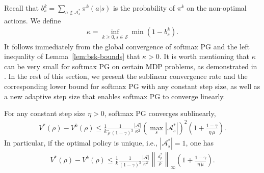 Recall that $b_s^k=\sum_{a\not\in\mathcal{A}_s^*}\pi^k(a|s)$ is the probability of $\pi^k$ on the non-optimal actions. We define 
\begin{align}
\kappa =\mathop {\mathrm{inf}} \limits_{k\ge 0,s\in \mathcal{S}}\min \left( 1-b_{s}^{k} \right) .
\label{def:kappa}
\end{align}
It follows immediately from the global convergence of softmax PG and the left inequality of Lemma~\ref{lem:bsk-bounds}
that $\kappa>0$. It is worth mentioning that $\kappa$  can be very small for softmax PG on certain MDP problems, as demonstrated in \cite{li2023exponential}.
 In the rest of this section, we present the sublinear convergence rate and the corresponding lower bound for softmax PG with any constant step size, as well as a new adaptive step size that enables softmax PG to converge linearly.  
\begin{theorem}\label{thm:softmaxPG-sublinear}
    For any  constant step size $\eta>0$, softmax PG converges sublinearly, 
    \begin{align*}
V^*(\rho)-V^k(\rho)\leq \frac{1}{k}\frac{1}{\tilde{\rho}\,(1-\gamma)^3}\frac{|\mathcal{A}|}{\kappa^2}\left(\max_s|\mathcal{A}_s^*|\right)^2\left(1+\frac{1-\gamma}{\eta\,\tilde{\mu}}\right).
\end{align*}
 In particular, if the optimal policy is unique, i.e., $|\mathcal{A}_s^*|=1$,  one has
\begin{align*}
V^*(\rho)-V^k(\rho)\leq \frac{1}{k}\frac{1}{(1-\gamma)^3}\frac{|\mathcal{A}|}{\kappa^2}\left\|\frac{d_\rho^*}{\rho}\right\|_\infty\left(1+\frac{1-\gamma}{\eta\,\tilde{\mu}}\right).
\end{align*}
\end{theorem}
